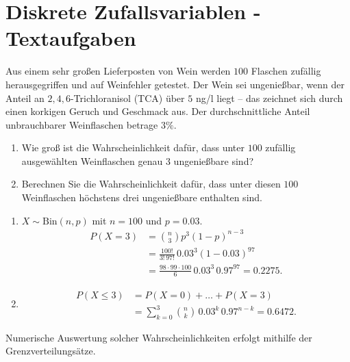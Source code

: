 \section{Diskrete Zufallsvariablen - Textaufgaben} 

 Aus einem sehr großen Lieferposten
von Wein werden $100$ Flaschen zufällig herausgegriffen und auf Weinfehler
getestet.  Der Wein sei ungenießbar, wenn der Anteil an $2,4,6$-Trichloranisol
(TCA) über $5$ ng/l liegt -- das zeichnet sich durch einen korkigen Geruch und
Geschmack aus.  Der durchschnittliche Anteil unbrauchbarer Weinflaschen betrage
$3\%$. 
\begin{enumerate}
    \item Wie groß ist die Wahrscheinlichkeit dafür, dass unter $100$ zufällig 
        ausgewählten Weinflaschen genau $3$ ungenießbare sind? 
    \item Berechnen Sie die Wahrscheinlichkeit dafür, dass unter diesen $100$
        Weinflaschen höchstens drei ungenießbare enthalten sind. 
\end{enumerate}

\solution 
\begin{enumerate}
    \item $X\sim \text{Bin}(n, p)$ mit $n=100$ und $p=0.03$. 
        \begin{align*}
            P(X=3) &= \binom{n}{3} p^{3}(1-p)^{n-3} \\
            &= \frac{100!}{3!\, 97!}\, {0.03}^{3}\left( 1-0.03 \right)^{97} \\
            &= \frac{98\cdot 99\cdot 100}{ 6}\, {0.03}^{3}\, {0.97}^{97} = 0.2275.
        \end{align*}
    \item \begin{align*}
            P(X\leq 3) &= P(X=0)+\dots+P(X=3) \\
            &= \sum_{k=0}^{3} \binom{n}{k}\, {0.03}^{k}\, {0.97}^{n-k} = 0.6472.
        \end{align*}
\end{enumerate}
Numerische Auswertung solcher Wahrscheinlichkeiten erfolgt mithilfe  der Grenzverteilungsätze.


